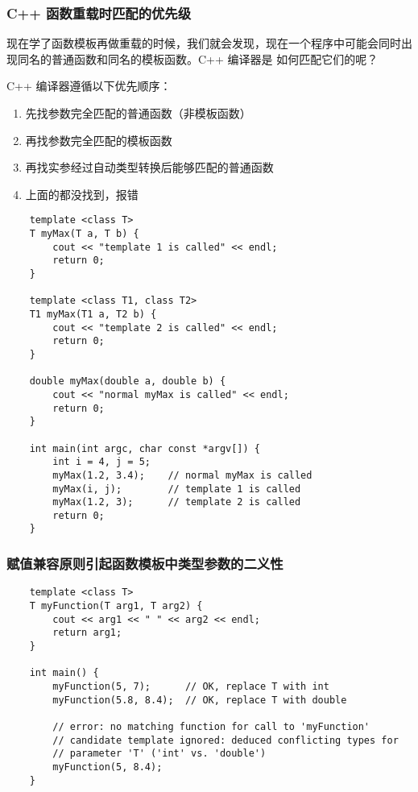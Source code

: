 \documentclass[UTF8]{ctexart}
\begin{document}
\subsubsection{C++ 函数重载时匹配的优先级}
现在学了函数模板再做重载的时候，我们就会发现，现在一个程序中可能会同时出现同名的普通函数和同名的模板函数。C++ 编译器是
如何匹配它们的呢？

C++ 编译器遵循以下优先顺序：
\begin{enumerate}
    \item 先找参数完全匹配的普通函数（非模板函数）
    \item 再找参数完全匹配的模板函数
    \item 再找实参经过自动类型转换后能够匹配的普通函数
    \item 上面的都没找到，报错
\end{enumerate}

\begin{verbatim}
    template <class T>
    T myMax(T a, T b) {
        cout << "template 1 is called" << endl;
        return 0;
    }

    template <class T1, class T2>
    T1 myMax(T1 a, T2 b) {
        cout << "template 2 is called" << endl;
        return 0;
    }

    double myMax(double a, double b) {
        cout << "normal myMax is called" << endl;
        return 0;
    }

    int main(int argc, char const *argv[]) {
        int i = 4, j = 5;
        myMax(1.2, 3.4);    // normal myMax is called
        myMax(i, j);        // template 1 is called
        myMax(1.2, 3);      // template 2 is called
        return 0;
    }
\end{verbatim}

\subsubsection{赋值兼容原则引起函数模板中类型参数的二义性}
\begin{verbatim}
    template <class T>
    T myFunction(T arg1, T arg2) {
        cout << arg1 << " " << arg2 << endl;
        return arg1;
    }

    int main() {
        myFunction(5, 7);      // OK, replace T with int
        myFunction(5.8, 8.4);  // OK, replace T with double

        // error: no matching function for call to 'myFunction'
        // candidate template ignored: deduced conflicting types for
        // parameter 'T' ('int' vs. 'double')
        myFunction(5, 8.4);
    }
\end{verbatim}
\end{document}
